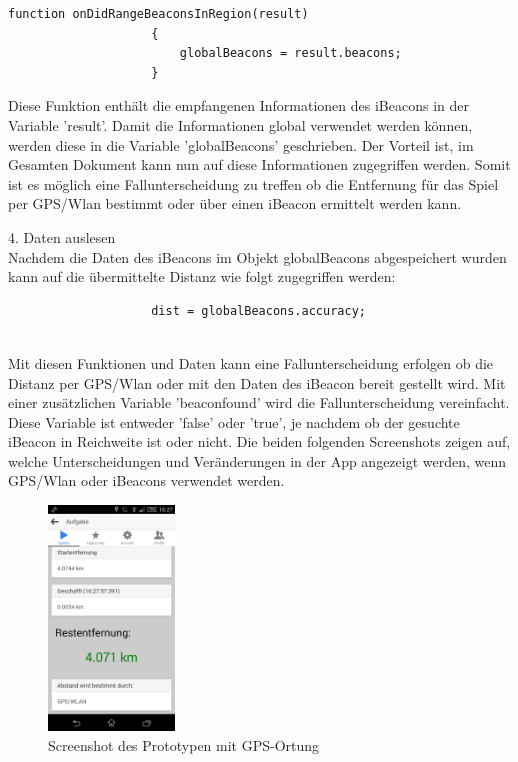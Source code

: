 \begin{lstlisting}
function onDidRangeBeaconsInRegion(result)
					{
						globalBeacons = result.beacons;
					}
\end{lstlisting}

Diese Funktion enthält die empfangenen Informationen des iBeacons in der Variable 'result'. Damit die Informationen global verwendet werden können, werden diese in die Variable 'globalBeacons' geschrieben. Der Vorteil ist, im Gesamten Dokument kann nun auf diese Informationen zugegriffen werden. Somit ist es möglich eine Fallunterscheidung zu treffen ob die Entfernung für das Spiel per GPS/Wlan bestimmt oder über einen iBeacon ermittelt werden kann.


4. Daten auslesen
\\Nachdem die Daten des iBeacons im Objekt globalBeacons abgespeichert wurden kann auf die übermittelte Distanz wie folgt zugegriffen werden:

\begin{lstlisting}
					dist = globalBeacons.accuracy;
					
\end{lstlisting}


Mit diesen Funktionen und Daten kann eine Fallunterscheidung erfolgen ob die Distanz per GPS/Wlan oder mit den Daten des iBeacon bereit gestellt wird.
Mit einer zusätzlichen Variable 'beaconfound' wird die Fallunterscheidung vereinfacht. Diese Variable ist entweder 'false' oder 'true', je nachdem ob der gesuchte iBeacon in Reichweite ist oder nicht. Die beiden folgenden Screenshots zeigen auf, welche Unterscheidungen und Veränderungen in der App angezeigt werden, wenn GPS/Wlan oder iBeacons verwendet werden.

\begin{figure}[ht]
\centering
\includegraphics[width=0.3\textwidth]{ref/images/screenshot1.png}
\caption[Screenshot des Prototypen mit GPS-Ortung]{Screenshot des Prototypen mit GPS-Ortung}
\label{fig:screenshotapp1}
\end{figure} 


